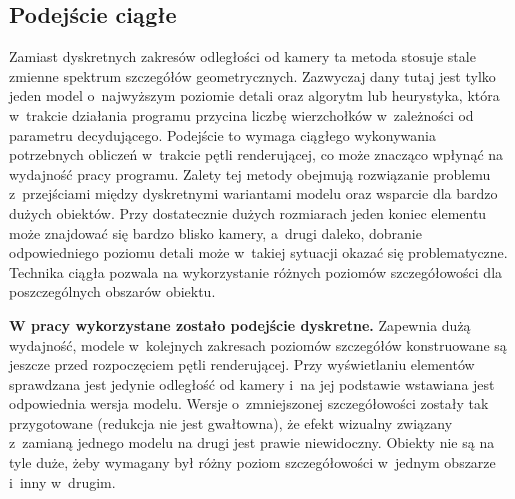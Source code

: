 \documentclass[a4paper,twoside,12pt]{book}
\begin{document}
\subsection{Podejście ciągłe}
Zamiast dyskretnych zakresów odległości od kamery ta metoda stosuje stale zmienne spektrum szczegółów geometrycznych. Zazwyczaj dany tutaj jest tylko jeden model o~najwyższym poziomie detali oraz algorytm lub heurystyka, która w~trakcie działania programu przycina liczbę wierzchołków w~zależności od parametru decydującego. Podejście to wymaga ciągłego wykonywania potrzebnych obliczeń w~trakcie pętli renderującej, co może znacząco wpłynąć na wydajność pracy programu. Zalety tej metody obejmują rozwiązanie problemu z~przejściami między dyskretnymi wariantami modelu oraz wsparcie dla bardzo dużych obiektów. Przy dostatecznie dużych rozmiarach jeden koniec elementu może znajdować się bardzo blisko kamery, a~drugi daleko, dobranie odpowiedniego poziomu detali może w~takiej sytuacji okazać się problematyczne. Technika ciągła pozwala na wykorzystanie różnych poziomów szczegółowości dla poszczególnych obszarów obiektu. \cite{lod} \cite{bib:hoppe}

\textbf{W pracy wykorzystane zostało podejście dyskretne.} Zapewnia dużą wydajność, modele w~kolejnych zakresach poziomów szczegółów konstruowane są jeszcze przed rozpoczęciem pętli renderującej. Przy wyświetlaniu elementów sprawdzana jest jedynie odległość od kamery i~na jej podstawie wstawiana jest odpowiednia wersja modelu. Wersje o~zmniejszonej szczegółowości zostały tak przygotowane (redukcja nie jest gwałtowna), że efekt wizualny związany z~zamianą jednego modelu na drugi jest prawie niewidoczny. Obiekty nie są na tyle duże, żeby wymagany był różny poziom szczegółowości w~jednym obszarze i~inny w~drugim. 


\end{document}
